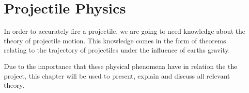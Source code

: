\chapter{Projectile Physics}\label{ProjPhys}
In order to accurately fire a projectile, we are going to need knowledge about
the theory of projectile motion. This knowledge comes in the form of theorems
relating to the trajectory of projectiles under the influence of earths
gravity.


Due to the importance that these physical phenomena have in relation the the
project, this chapter will be used to present, explain and discuss all relevant
theory.




